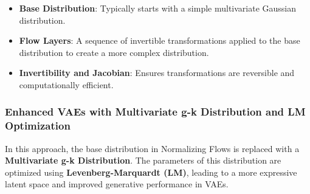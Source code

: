 \documentclass[11pt]{article}
\providecommand{\tightlist}{%
      \setlength{\itemsep}{0pt}\setlength{\parskip}{0pt}}
\begin{document}
\begin{itemize}
\tightlist
\item
  \textbf{Base Distribution}: Typically starts with a simple
  multivariate Gaussian distribution.
\item
  \textbf{Flow Layers}: A sequence of invertible transformations applied
  to the base distribution to create a more complex distribution.
\item
  \textbf{Invertibility and Jacobian}: Ensures transformations are
  reversible and computationally efficient.
\end{itemize}

\subsubsection{Enhanced VAEs with Multivariate g-k Distribution and LM
Optimization}\label{enhanced-vaes-with-multivariate-g-k-distribution-and-lm-optimization}

In this approach, the base distribution in Normalizing Flows is replaced
with a \textbf{Multivariate g-k Distribution}. The parameters of this
distribution are optimized using \textbf{Levenberg-Marquardt (LM)},
leading to a more expressive latent space and improved generative
performance in VAEs.
\end{document}
